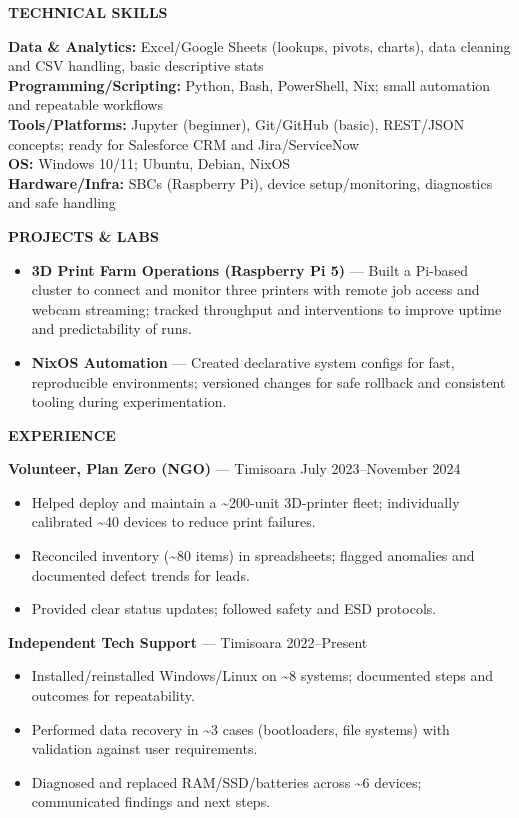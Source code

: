 \documentclass[11pt,a4paper]{article}
\newcommand{\sectionheader}[1]{\vspace{6pt}\textbf{\large #1}\par\vspace{4pt}}
\begin{document}
\sectionheader{TECHNICAL SKILLS}
\textbf{Data \& Analytics:} Excel/Google Sheets (lookups, pivots, charts), data cleaning and CSV handling, basic descriptive stats\\
\textbf{Programming/Scripting:} Python, Bash, PowerShell, Nix; small automation and repeatable workflows\\
\textbf{Tools/Platforms:} Jupyter (beginner), Git/GitHub (basic), REST/JSON concepts; ready for Salesforce CRM and Jira/ServiceNow\\
\textbf{OS:} Windows 10/11; Ubuntu, Debian, NixOS\\
\textbf{Hardware/Infra:} SBCs (Raspberry Pi), device setup/monitoring, diagnostics and safe handling

\sectionheader{PROJECTS \& LABS}
\begin{itemize}
  \item \textbf{3D Print Farm Operations (Raspberry Pi 5)} — Built a Pi-based cluster to connect and monitor three printers with remote job access and webcam streaming; tracked throughput and interventions to improve uptime and predictability of runs.
  \item \textbf{NixOS Automation} — Created declarative system configs for fast, reproducible environments; versioned changes for safe rollback and consistent tooling during experimentation.
\end{itemize}

\sectionheader{EXPERIENCE}
\textbf{Volunteer, Plan Zero (NGO)} — Timisoara \hfill July 2023–November 2024\\[-2pt]
\begin{itemize}
  \item Helped deploy and maintain a \textasciitilde200-unit 3D-printer fleet; individually calibrated \textasciitilde40 devices to reduce print failures.
  \item Reconciled inventory (\textasciitilde80 items) in spreadsheets; flagged anomalies and documented defect trends for leads.
  \item Provided clear status updates; followed safety and ESD protocols.
\end{itemize}

\textbf{Independent Tech Support} — Timisoara \hfill 2022–Present\\[-2pt]
\begin{itemize}
  \item Installed/reinstalled Windows/Linux on \textasciitilde8 systems; documented steps and outcomes for repeatability.
  \item Performed data recovery in \textasciitilde3 cases (bootloaders, file systems) with validation against user requirements.
  \item Diagnosed and replaced RAM/SSD/batteries across \textasciitilde6 devices; communicated findings and next steps.
\end{itemize}
\end{document}
